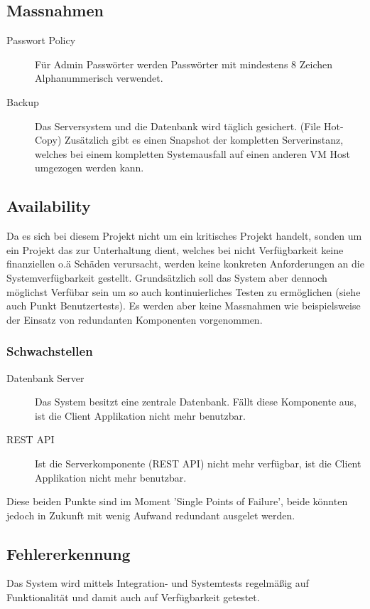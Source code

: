 \documentclass[10pt,a4paper]{scrartcl}
\begin{document}
\subsection{Massnahmen}
\begin{description}
\item[Passwort Policy]
Für Admin Passwörter werden Passwörter mit mindestens 8 Zeichen Alphanummerisch verwendet.
\item[Backup]
Das Serversystem und die Datenbank wird täglich gesichert. (File Hot-Copy)
Zusätzlich gibt es einen Snapshot der kompletten Serverinstanz, welches bei einem kompletten Systemausfall auf einen anderen VM Host umgezogen werden kann.
\end{description}
\subsection{Availability}
Da es sich bei diesem Projekt nicht um ein kritisches Projekt handelt, sonden um ein Projekt das zur Unterhaltung dient, welches bei nicht Verfügbarkeit keine finanziellen o.ä Schäden verursacht, werden keine konkreten Anforderungen an die Systemverfügbarkeit gestellt. Grundsätzlich soll das System aber dennoch möglichst Verfübar sein um so auch kontinuierliches Testen zu ermöglichen (siehe auch Punkt Benutzertests). Es werden aber keine Massnahmen wie beispielsweise der Einsatz von redundanten Komponenten vorgenommen.
\subsubsection{Schwachstellen}
\begin{description}
\item[Datenbank Server]
Das System besitzt eine zentrale Datenbank. Fällt diese Komponente aus, ist die Client Applikation nicht mehr benutzbar.
\item[REST API]
Ist die Serverkomponente (REST API) nicht mehr verfügbar, ist die Client Applikation nicht mehr benutzbar.
\end{description}
Diese beiden Punkte sind im Moment 'Single Points of Failure', beide könnten jedoch in Zukunft mit wenig Aufwand redundant ausgelet werden.
\subsection{Fehlererkennung}
Das System wird mittels Integration- und Systemtests regelmäßig auf Funktionalität und damit auch auf Verfügbarkeit getestet.
\end{document}
